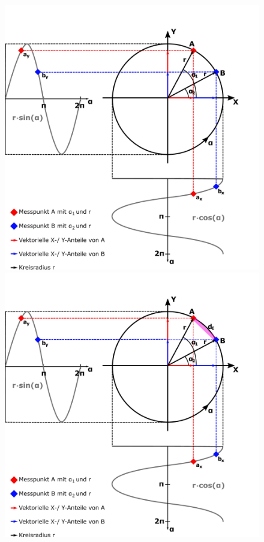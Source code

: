 \documentclass{beamer}
\begin{document}
\begin{frame}
\begin{columns}[c]
	\begin{figure}
		\begin{overprint}
			\includegraphics[width=\linewidth]{images/Kreisdarstellung_Winkelabstand-1}
			\onslide<3>\includegraphics[width=\linewidth]{images/Kreisdarstellung_Winkelabstand-2}

\end{overprint}
\end{figure}
\end{columns}
\end{frame}
\end{document}
